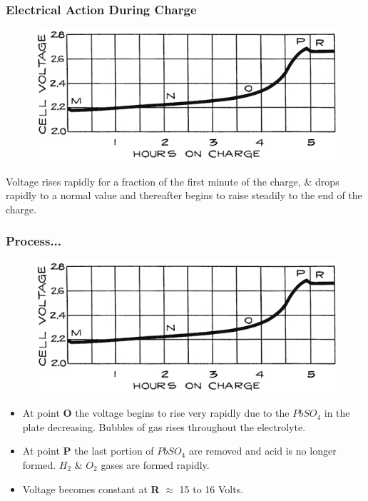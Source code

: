 \documentclass{beamer}
\begin{document}
  \begin{frame}    %
    \frametitle{Electrical Action During Charge}
    \begin{figure}
      \includegraphics[width=0.8\linewidth]{./Resources/Images/voltage_during_charge.jpg}
    \end{figure}
    Voltage rises rapidly for a fraction of the first minute of the charge, \& drops rapidly
    to a normal value and thereafter begins to raise steadily to the end of the charge.
  \end{frame}

  \begin{frame}    %
  \frametitle{Process...}
  \fontsize{9pt}{14}\selectfont
    \vspace{-20pt}
    \begin{figure}
      \includegraphics[width=0.6\linewidth]{./Resources/Images/voltage_during_charge.jpg}
    \end{figure}

    \begin{itemize}
      \item At point \textbf{O} the voltage begins to rise very rapidly due to the $PbSO_{4}$ in the plate decreasing. Bubbles of gas rises throughout the electrolyte.
      \item At point \textbf{P} the last portion of $PbSO_{4}$ are removed and acid is no longer formed. $H_{2}$ \& $O_{2}$ gases are formed rapidly.
      \item Voltage becomes constant at \textbf{R} $\approx$ 15 to 16 Volts.
    \end{itemize}    
  \end{frame}
  
\end{document}
